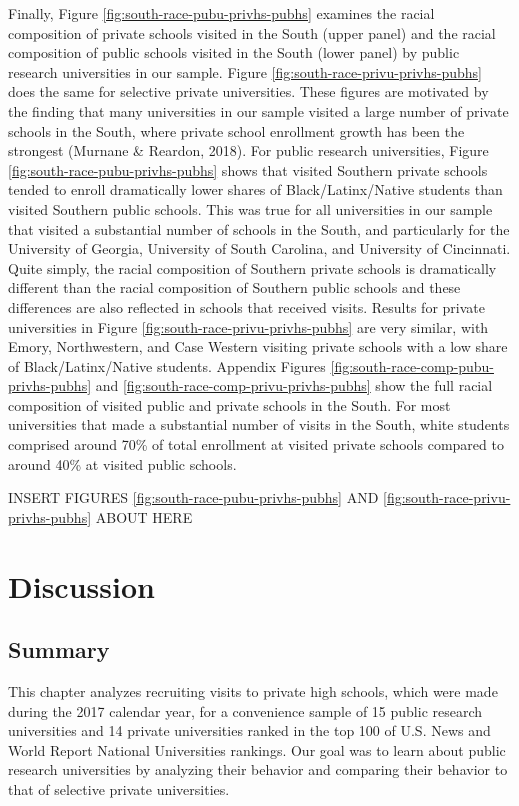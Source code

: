 \documentclass[
  12pt,
]{article}
\begin{document}
Finally, Figure \ref{fig:south-race-pubu-privhs-pubhs} examines the racial composition of private schools visited in the South (upper panel) and the racial composition of public schools visited in the South (lower panel) by public research universities in our sample. Figure \ref{fig:south-race-privu-privhs-pubhs} does the same for selective private universities. These figures are motivated by the finding that many universities in our sample visited a large number of private schools in the South, where private school enrollment growth has been the strongest (Murnane \& Reardon, 2018). For public research universities, Figure \ref{fig:south-race-pubu-privhs-pubhs} shows that visited Southern private schools tended to enroll dramatically lower shares of Black/Latinx/Native students than visited Southern public schools. This was true for all universities in our sample that visited a substantial number of schools in the South, and particularly for the University of Georgia, University of South Carolina, and University of Cincinnati. Quite simply, the racial composition of Southern private schools is dramatically different than the racial composition of Southern public schools and these differences are also reflected in schools that received visits. Results for private universities in Figure \ref{fig:south-race-privu-privhs-pubhs} are very similar, with Emory, Northwestern, and Case Western visiting private schools with a low share of Black/Latinx/Native students. Appendix Figures \ref{fig:south-race-comp-pubu-privhs-pubhs} and \ref{fig:south-race-comp-privu-privhs-pubhs} show the full racial composition of visited public and private schools in the South. For most universities that made a substantial number of visits in the South, white students comprised around 70\% of total enrollment at visited private schools compared to around 40\% at visited public schools.

INSERT FIGURES \ref{fig:south-race-pubu-privhs-pubhs} AND \ref{fig:south-race-privu-privhs-pubhs} ABOUT HERE

\section{Discussion}\label{discussion}

\subsection{Summary}\label{summary}

This chapter analyzes recruiting visits to private high schools, which were made during the 2017 calendar year, for a convenience sample of 15 public research universities and 14 private universities ranked in the top 100 of U.S. News and World Report National Universities rankings. Our goal was to learn about public research universities by analyzing their behavior and comparing their behavior to that of selective private universities.
\end{document}
